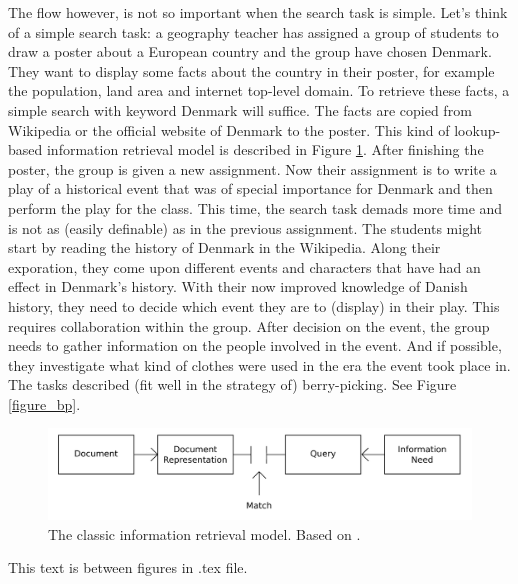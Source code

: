 The flow however, is not so important when the search task is simple. Let's think of a simple search task: a geography teacher has assigned a group of students to draw a poster about a European country and the group have chosen Denmark. They want to display some facts about the country in their poster, for example the population, land area and internet top-level domain. To retrieve these facts, a simple search with keyword Denmark will suffice. The facts are copied from Wikipedia or the official website of Denmark to the poster. This kind of lookup-based information retrieval model is described in Figure \ref{figure_classicIR}. 
After finishing the poster, the group is given a new assignment.
Now their assignment is to write a play of a historical event that was of special importance for Denmark and then perform the play for the class.
This time, the search task demads more time and is not as (easily definable) as in the previous assignment.
The students might start by reading the history of Denmark in the Wikipedia.
Along their exporation, they come upon different events and characters that have had an effect in Denmark's history.
With their now improved knowledge of Danish history, they need to decide which event they are to (display) in their play.
This requires collaboration within the group.
After decision on the event, the group needs to gather information on the people involved in the event. 
And if possible, they investigate what kind of clothes were used in the era the event took place in.
The tasks described (fit well in the strategy of) berry-picking. See Figure \ref{figure_bp}.

\begin{figure}[htp] %
\caption{The classic information retrieval model. Based on \protect\cite{bates89}.}
\label{figure_classicIR}
\centering
\includegraphics[scale=0.45]{figures/classicIR.pdf}
\end{figure}

This text is between figures in .tex file.

